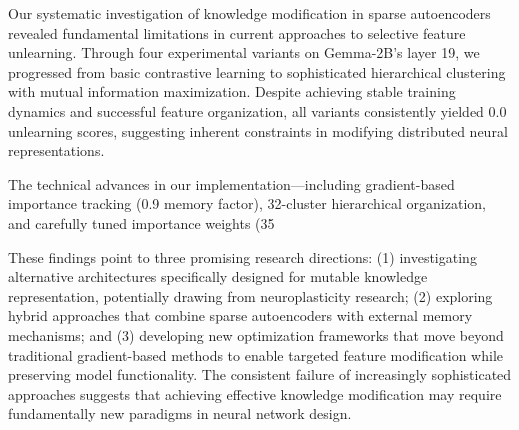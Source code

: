 \documentclass{article} %
\begin{document}
Our systematic investigation of knowledge modification in sparse autoencoders revealed fundamental limitations in current approaches to selective feature unlearning. Through four experimental variants on Gemma-2B's layer 19, we progressed from basic contrastive learning to sophisticated hierarchical clustering with mutual information maximization. Despite achieving stable training dynamics and successful feature organization, all variants consistently yielded 0.0 unlearning scores, suggesting inherent constraints in modifying distributed neural representations.

The technical advances in our implementation—including gradient-based importance tracking (0.9 memory factor), 32-cluster hierarchical organization, and carefully tuned importance weights (35%

These findings point to three promising research directions: (1) investigating alternative architectures specifically designed for mutable knowledge representation, potentially drawing from neuroplasticity research; (2) exploring hybrid approaches that combine sparse autoencoders with external memory mechanisms; and (3) developing new optimization frameworks that move beyond traditional gradient-based methods to enable targeted feature modification while preserving model functionality. The consistent failure of increasingly sophisticated approaches suggests that achieving effective knowledge modification may require fundamentally new paradigms in neural network design.



\end{document}
